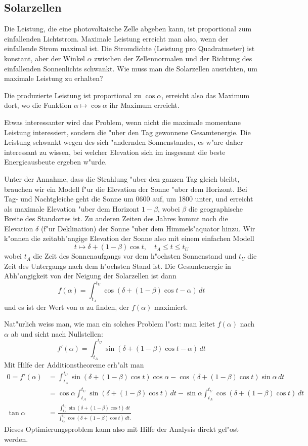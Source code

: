 \subsection{Solarzellen\label{uebersicht:solarzellen}}
Die Leistung, die eine photovoltaische Zelle abgeben kann, ist proportional
zum einfallenden Lichtstrom. Maximale Leistung erreicht man also,
wenn der einfallende Strom maximal ist. Die Stromdichte (Leistung 
pro Quadratmeter) ist konstant, aber der Winkel $\alpha$ zwischen der
Zellennormalen und der Richtung des einfallenden Sonnenlichts schwankt.
Wie muss man die Solarzellen ausrichten, um maximale Leistung zu erhalten?

Die produzierte Leistung ist proportional zu $\cos\alpha$, erreicht also
das Maximum dort, wo die Funktion $\alpha\mapsto\cos\alpha$ ihr
Maximum erreicht.

Etwas interessanter wird das Problem, wenn nicht die maximale momentane
Leistung interessiert, sondern die "uber den Tag gewonnene Gesamtenergie.
Die Leistung schwankt wegen des sich "andernden Sonnenstandes, es w"are
daher interessant zu wissen, bei welcher Elevation sich im insgesamt
die beste Energieausbeute ergeben w"urde.

Unter der Annahme, dass die Strahlung "uber den ganzen Tag gleich bleibt,
brauchen wir ein Modell f"ur die Elevation der Sonne "uber dem Horizont.
Bei Tag- und Nachtgleiche geht die Sonne um 0600 auf, um 1800 unter,
und erreicht als maximale Elevation "uber dem Horizont $1-\beta$,
wobei $\beta$ die geographische Breite des Standortes ist.
Zu anderen Zeiten des Jahres kommt noch die Elevation $\delta$
(f"ur Deklination) der Sonne "uber dem Himmels"aquator hinzu.
Wir k"onnen die zeitabh"angige Elevation der Sonne also mit einem
einfachen Modell
\[
t\mapsto \delta + (1-\beta)\cos t,\quad t_A\le t\le t_U
\]
wobei $t_A$ die Zeit des Sonnenaufgangs vor dem h"ochsten Sonnenstand
und $t_U$ die Zeit des Untergangs nach dem h"ochsten Stand ist.
Die Gesamtenergie in Abh"angigkeit von der Neigung der
Solarzellen ist dann
\[
f(\alpha)=
\int_{t_A}^{t_U} \cos (\delta+(1-\beta)\cos t - \alpha)\,dt
\]
und es ist der Wert von $\alpha$ zu finden, der $f(\alpha)$
maximiert.

Nat"urlich weiss man, wie man ein solches Problem l"ost: man leitet
$f(\alpha)$ nach $\alpha$ ab und sicht nach Nullstellen:
\[
f'(\alpha)=\int_{t_A}^{t_U}
\sin(\delta + (1-\beta)\cos t-\alpha)
\,dt
\]
Mit Hilfe der Additionstheoreme erh"alt man
\begin{align*}
0=
f'(\alpha)
&=
\int_{t_A}^{t_U}
\sin(\delta + (1-\beta)\cos t)\cos\alpha
-
\cos(\delta + (1-\beta)\cos t)\sin\alpha
\,dt
\\
&=
\cos\alpha
\int_{t_A}^{t_U}
\sin(\delta + (1-\beta)\cos t)\,dt
-
\sin\alpha
\int_{t_A}^{t_U}
\cos(\delta + (1-\beta)\cos t)
\,dt
\\
\tan\alpha
&=
\frac{
\int_{t_A}^{t_U}
\sin(\delta + (1-\beta)\cos t)\,dt
}{
\int_{t_A}^{t_U}
\cos(\delta + (1-\beta)\cos t)\,dt.
}
\end{align*}
Dieses Optimierungsproblem kann also mit Hilfe der Analysis direkt
gel"ost werden.

